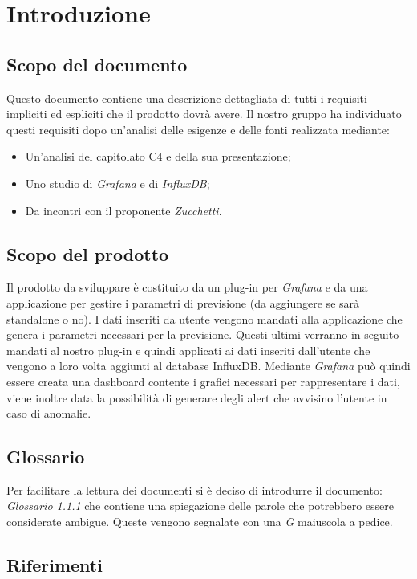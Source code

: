 \documentclass[a4]{article}
\begin{document}
	\section{Introduzione}
		\subsection{Scopo del documento}
			Questo documento contiene una descrizione dettagliata di tutti i requisiti impliciti ed espliciti che il prodotto dovrà avere. Il nostro gruppo ha individuato questi requisiti dopo un'analisi delle esigenze e delle fonti realizzata mediante: 
				\begin{itemize}
					\item Un'analisi del capitolato C4 e della sua presentazione; 
					\item Uno studio di \textit{Grafana} e di \textit{InfluxDB};
					\item Da incontri con il proponente \textit{Zucchetti}.
				\end{itemize}
		\subsection{Scopo del prodotto}
			Il prodotto da sviluppare è costituito da un plug-in per \textit{Grafana} e da una applicazione per gestire i parametri di previsione (da aggiungere se sarà standalone o no). I dati inseriti da utente vengono mandati alla applicazione che genera i parametri necessari per la previsione. Questi ultimi verranno in seguito mandati al nostro plug-in e quindi applicati ai dati inseriti dall'utente che vengono a loro volta aggiunti al database InfluxDB. Mediante \textit{Grafana} può quindi essere creata una dashboard contente i grafici necessari per rappresentare i dati, viene inoltre data la possibilità di generare degli alert che avvisino l'utente in caso di anomalie.
		
		\subsection{Glossario}
			Per facilitare la lettura dei documenti si è deciso di introdurre il documento: \textit{Glossario 1.1.1} che contiene una spiegazione delle parole che potrebbero essere considerate ambigue. Queste vengono segnalate con una \textit{G} maiuscola a pedice.  
		\subsection{Riferimenti}
\end{document}
